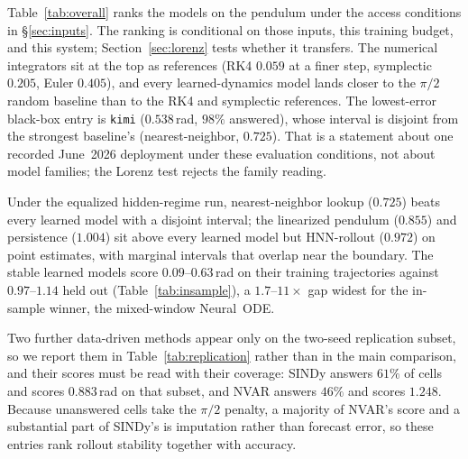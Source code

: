 \documentclass{article}
\begin{document}
Table~\ref{tab:overall} ranks the models on the pendulum under the access conditions in
\S\ref{sec:inputs}. The ranking is conditional on those inputs, this training budget, and this
system; Section~\ref{sec:lorenz} tests whether it transfers. The numerical integrators sit at the top as
references (RK4 $0.059$ at a finer step, symplectic $0.205$, Euler $0.405$),
and every learned-dynamics model lands closer to the $\pi/2$ random baseline than to the
RK4 and symplectic references. The lowest-error black-box entry is \texttt{kimi}
($0.538$\,rad, $98\%$ answered), whose interval is disjoint from the strongest baseline's
(nearest-neighbor, $0.725$).
That is a statement about one recorded June~2026 deployment under these evaluation
conditions, not about model families; the Lorenz test rejects the family reading.

Under the equalized hidden-regime run, nearest-neighbor lookup ($0.725$) beats every learned
model with a disjoint interval; the linearized pendulum ($0.855$) and persistence ($1.004$) sit
above every learned model but HNN-rollout ($0.972$) on point estimates, with marginal intervals
that overlap near the boundary. The stable learned models
score $0.09$--$0.63$\,rad on their training trajectories against $0.97$--$1.14$ held out
(Table~\ref{tab:insample}), a $1.7$--$11\times$ gap widest for the in-sample winner,
the mixed-window Neural~ODE.

Two further data-driven methods appear only on the two-seed replication subset, so we report them
in Table~\ref{tab:replication} rather than in the main comparison, and their scores must be read
with their coverage: SINDy answers $61\%$ of cells and scores $0.883$\,rad on that subset, and
NVAR answers $46\%$ and scores $1.248$. Because unanswered cells take the $\pi/2$ penalty, a
majority of NVAR's score and a substantial part of SINDy's is imputation rather than forecast
error, so these entries rank rollout stability together with accuracy.
\end{document}
